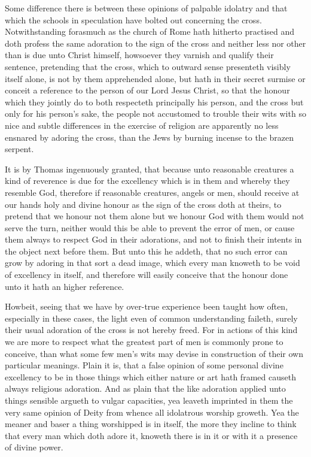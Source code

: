 Some difference there is between these opinions of palpable idolatry and that which the schools in speculation have bolted out concerning the cross. Notwithstanding forasmuch as the church of Rome hath hitherto practised and doth profess the same adoration to the sign of the cross and neither less nor other than is due unto Christ himself, howsoever they varnish and qualify their sentence, pretending that the cross, which to outward sense presenteth visibly itself alone, is not by them apprehended alone, but hath in their secret surmise or conceit a reference to the person of our Lord Jesus Christ, so that the honour which they jointly do to both respecteth principally his person, and the cross but only for his person’s sake, the people not accustomed to trouble their wits with so nice and subtle differences in the exercise of religion are apparently no less ensnared by adoring the cross, than the Jews by burning incense to the brazen serpent.

It is by Thomas ingenuously granted, that because unto reasonable creatures a kind of reverence is due for the excellency which is in them and whereby they resemble God, therefore if reasonable creatures, angels or men, should receive at our hands holy and divine honour as the sign of the cross  doth at theirs,
 to pretend that we honour not them alone but we honour God with them would not serve the turn, neither would this be able to prevent the error of men, or cause them always to respect God in their adorations, and not to finish their intents in the object next before them. But unto this he addeth, that no such error can grow by adoring in that sort a dead image, which every man knoweth to be void of excellency in itself, and therefore will easily conceive that the honour done unto it hath an higher reference.

Howbeit, seeing that we have by over-true experience been taught how often, especially in these cases, the light even of common understanding faileth, surely their usual adoration of the cross is not hereby freed. For in actions of this kind we are more to respect what the greatest part of men is commonly prone to conceive, than what some few men’s wits may devise in construction of their own particular meanings. Plain it is, that a false opinion of some personal divine excellency to be in those things which either nature or art hath framed causeth always religious adoration. And as plain that the like adoration applied unto things sensible argueth to vulgar capacities, yea leaveth imprinted in them the very same opinion of Deity from whence all idolatrous worship groweth. Yea the meaner and baser a thing worshipped is in itself, the more they incline to think that every man which doth adore it, knoweth there is in it or with it a presence of divine power.

